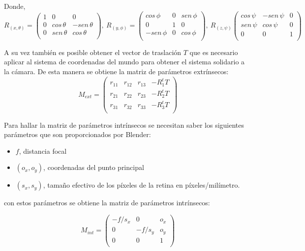  Donde,
 \[R_{(x,\theta)} = \begin{pmatrix}
		1 &   0         &  0\\
		0 & cos\,\theta & -sen\,\theta\\
		0 & sen\,\theta & cos\,\theta\\ 
\end{pmatrix}, ~
R_{(y,\phi)}=\begin{pmatrix}
		cos\,\phi  & 0 & sen\,\phi\\
		0          & 1 & 0\\
		-sen\,\phi &0  & cos\,\phi\\ 
\end{pmatrix}, ~
R_{(z,\psi)}\begin{pmatrix}
		cos\,\psi & -sen\,\psi & 0\\
		sen\,\psi & cos\,\psi  & 0\\
		 0          & 0            & 1\\ 
\end{pmatrix}\]

A su vez también es posible obtener el vector de traslación $T$ que es necesario aplicar al sistema de coordenadas del mundo para obtener el sistema solidario a la cámara. De esta manera se obtiene la matriz de parámetros extrínsecos:
\[
		M_{ext}=\begin{pmatrix}
			r_{11} & r_{12} & r_{13} &-R^t_1 T\\
			r_{21} & r_{22} & r_{23} &-R^t_2 T\\
			r_{31} & r_{32} & r_{33} &-R^t_3 T\\
		\end{pmatrix}
\] 

Para hallar la matriz de parámetros intrínsecos se necesitan saber los siguientes parámetros que son proporcionados por Blender: 
\begin{itemize}
\item $f$, distancia focal
\item $(o_x, o_y)$, coordenadas del punto principal
\item $(s_x,s_y)$, tamaño efectivo de los píxeles de la retina en píxeles/milímetro.
\end{itemize}

con estos parámetros se obtiene la matriz de parámetros intrínsecos:

\[M_{int}=\begin{pmatrix}
			-f/s_x & 0      & o_x\\
			0      & -f/s_y & o_y\\
			0      & 0      & 1\\
		\end{pmatrix} \]
 

